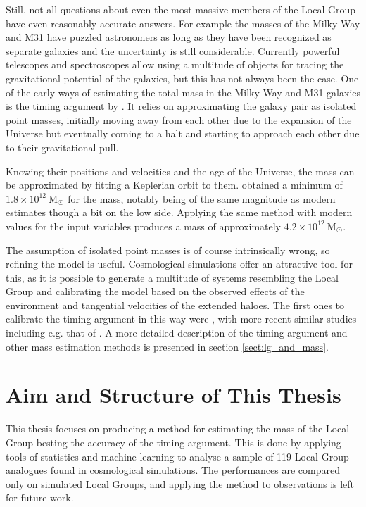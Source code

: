 \documentclass[english, twoside]{HYgradu}
\begin{document}
Still, not all questions about even the most massive members of the Local Group have even reasonably accurate answers. For example the masses of the Milky Way and M31 have puzzled astronomers as long as they have been recognized as separate galaxies and the uncertainty is still considerable. Currently powerful telescopes and spectroscopes allow using a multitude of objects for tracing the gravitational potential of the galaxies, but this has not always been the case. One of the early ways of estimating the total mass in the Milky Way and M31 galaxies is the timing argument by \citet{kahn1959intergalactic}. It relies on approximating the galaxy pair as isolated point masses, initially moving away from each other due to the expansion of the Universe but eventually coming to a halt and starting to approach each other due to their gravitational pull.

Knowing their positions and velocities and the age of the Universe, the mass can be approximated by fitting a Keplerian orbit to them. \citeauthor{kahn1959intergalactic} obtained a minimum of $1.8 \times 10^{12}\ \mathrm{M}_{\astrosun}$ for the mass, notably being of the same magnitude as modern estimates though a bit on the low side. Applying the same method with modern values for the input variables produces a mass of approximately $4.2 \times 10^{12}\ \mathrm{M}_{\astrosun}$.

The assumption of isolated point masses is of course intrinsically wrong, so refining the model is useful. Cosmological simulations offer an attractive tool for this, as it is possible to generate a multitude of systems resembling the Local Group and calibrating the model based on the observed effects of the environment and tangential velocities of the extended haloes. The first ones to calibrate the timing argument in this way were \citet{kroeker1991accuracy}, with more recent similar studies including e.g. that of \citet{li2008masses}. A more detailed description of the timing argument and other mass estimation methods is presented in section \ref{sect:lg_and_mass}.


\section{Aim and Structure of This Thesis}
This thesis focuses on producing a method for estimating the mass of the Local Group besting the accuracy of the timing argument. This is done by applying tools of statistics and machine learning to analyse a sample of 119 Local Group analogues found in cosmological simulations. The performances are compared only on simulated Local Groups, and applying the method to observations is left for future work.
\end{document}
